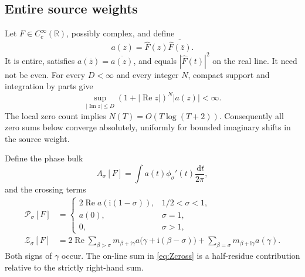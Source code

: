 \documentclass[11pt]{article}
\numberwithin{equation}{section}
\theoremstyle{definition}
\theoremstyle{remark}
\newcommand{\Rea}{\operatorname{Re}}
\newcommand{\Ima}{\operatorname{Im}}
\newcommand{\ii}{\mathrm i}
\newcommand{\dd}{\,\mathrm d}
\begin{document}
\subsection{Entire source weights}

Let \(F\in C_c^\infty(\mathbb R)\), possibly complex, and define
\begin{equation}\label{eq:entire-a}
a(z)=\widehat F(z)\overline{\widehat F(\overline z)}.
\end{equation}
It is entire, satisfies \(a(\overline z)=\overline{a(z)}\),
and equals \(|\widehat F(t)|^2\) on the real line.
It need not be even. For every \(D<\infty\) and every integer \(N\),
compact support and integration by parts give
\begin{equation}\label{eq:strip-decay}
\sup_{|\Ima z|\le D}(1+|\Rea z|)^N|a(z)|<\infty.
\end{equation}
The local zero count implies \(N(T)=O(T\log(T+2))\).
Consequently all zero sums below converge absolutely, uniformly
for bounded imaginary shifts in the source weight.

Define the phase bulk
\[
A_\sigma[F]=\int a(t)\phi_\sigma'(t)\frac{\dd t}{2\pi},
\]
and the crossing terms
\begin{align}
\mathcal P_\sigma[F]
&=
\begin{cases}
2\Rea a(\ii(1-\sigma)),&1/2<\sigma<1,\\
a(0),&\sigma=1,\\
0,&\sigma>1,
\end{cases}
\label{eq:Pcross}\\
\mathcal Z_\sigma[F]
&=2\Rea\sum_{\beta>\sigma}m_{\beta+\ii\gamma}
a\bigl(\gamma+\ii(\beta-\sigma)\bigr)
+\sum_{\beta=\sigma}m_{\beta+\ii\gamma}a(\gamma).
\label{eq:Zcross}
\end{align}
Both signs of \(\gamma\) occur. The on-line sum in
\eqref{eq:Zcross} is a half-residue contribution relative to
the strictly right-hand sum.
\end{document}
